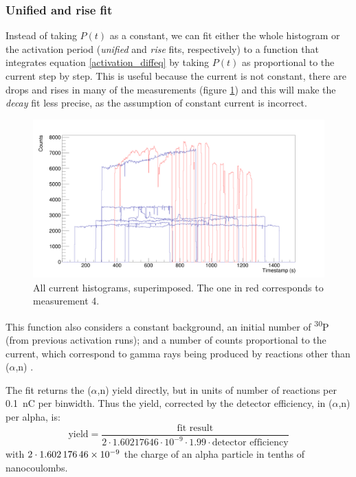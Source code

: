 \documentclass[a4paper,12pt]{report}
\newcommand{\an}{($\alpha$,n) }
\newcommand{\Piso}{\textsuperscript{30}P }
\begin{document}
\subsubsection{Unified and rise fit}
Instead of taking $P(t)$ as a constant, we can fit either the whole histogram or the activation period (\textit{unified} and \textit{rise} fits, respectively) to a function that integrates equation \ref{activation_diffeq} by taking $P(t)$ as proportional to the current step by step.
This is useful because the current is not constant, there are drops and rises in many of the measurements (figure \ref{current_histograms}) and this will make the \textit{decay} fit less precise, as the assumption of constant current is incorrect.

\begin{figure}[H]
	\centering
	\includegraphics[width=\textwidth]{current_histograms.png}
	\caption{All current histograms, superimposed.
	The one in red corresponds to measurement 4.}
	\label{current_histograms}
\end{figure}

This function also considers a constant background, an initial number of \Piso (from previous activation runs); and a number of counts proportional to the current, which correspond to gamma rays being produced by reactions other than \an.	%

The fit returns the \an yield directly, but in units of number of reactions per \qty{0.1}{\nano\coulomb} per binwidth.
Thus the yield, corrected by the detector efficiency, in \an per alpha, is:
\begin{equation}
	\text{yield} = \frac{\text{fit result}}{2\cdot1.60217646\cdot10^{-9}\cdot 1.99 \cdot \text{detector efficiency}}
\end{equation}
with $2\cdot\num{1.60217646E-9}$ the charge of an alpha particle in tenths of nanocoulombs.
\\
\end{document}
